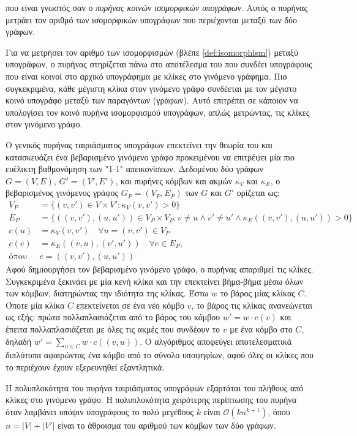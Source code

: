 που είναι γνωστός σαν ο \textit{πυρήνας κοινών ισομορφικών υπογράφων}.
Αυτός ο πυρήνας μετράει τον αριθμό των ισομορφικών υπογράφων που περιέχονται μεταξύ των δύο γράφων.\par
Για να μετρήσει τον αριθμό των ισομορφισμών (βλέπε \ref{def:isomorphism}) μεταξύ υπογράφων, ο πυρήνας στηρίζεται πάνω στο αποτέλεσμα του  \cite{levi1973note} που συνδέει υπογράφους που είναι κοινοί στο αρχικό υπογράφημα με κλίκες στο γινόμενο γράφημα.
Πιο συγκεκριμένα, κάθε μέγιστη κλίκα στον γινόμενο γράφο συνδέεται με τον μέγιστο κοινό υπογράφο μεταξύ των παραγόντων (γράφων).
Αυτό επιτρέπει σε κάποιον να υπολογίσει τον κοινό πυρήνα ισομορφισμού υπογράφων, απλώς μετρώντας, τις κλίκες στον γινόμενο γράφο.\par
Ο γενικός πυρήνας ταιριάσματος υπογράφων επεκτείνει την θεωρία του  και κατασκευάζει ένα βεβαρισμένο γινόμενο γράφο προκειμένου να επιτρέψει μία πιο ευέλικτη βαθμονόμηση των "1-1" απεικονίσεων.
Δεδομένου δύο γράφων $G=(V,E)$, $G'=(V',E')$, και πυρήνες κόμβων και ακμών $\kappa_V$ και $\kappa_E$, ο βεβαρισμένος γινόμενος γράφος $G_P=(V_P, E_P)$ των $G$ και $G'$ ορίζεται ως:
\begin{equation}
    \begin{split}
        V_P &= \{ (v,v') \in V \times V' : \kappa_V(v,v') > 0 \} \\
        E_P &= \{ ((v,v'),(u,u')) \in V_P \times V_P : v \neq u \wedge v' \neq u' \wedge \kappa_E((v,v'),(u,u')) > 0 \} \\
        c(u) &= \kappa_V(v,v') \quad \forall u=(v,v') \in V_P \\
        c(e) &= \kappa_E((v,u),(v',u')) \quad \forall e \in E_P, \\
        \text{όπου } &e=((v,v'),(u,u')) 
    \end{split}
\end{equation}
Αφού δημιουργήσει τον βεβαρισμένο γινόμενο γράφο, ο πυρήνας απαριθμεί τις κλίκες.
Συγκεκριμένα ξεκινάει με μία κενή κλίκα και την επεκτείνει βήμα-βήμα μέσω όλων των κόμβων, διατηρώντας την ιδιότητα της κλίκας. 
Έστω $w$ το βάρος μίας κλίκας $C$.
Όποτε μία κλίκα $C$ επεκτείνεται σε ένα νέο κόμβο $v$, το βάρος τις κλίκας ανανεώνεται ως εξής: πρώτα πολλαπλασιάζεται από το βάρος του κόμβου $w' = w \cdot c(v)$ και έπειτα πολλαπλασιάζεται με όλες τις ακμές που συνδέουν το $v$ με ένα κόμβο στο $C$, δηλαδή $w' = \sum_{u \in C} w \cdot c((v,u))$.
Ο αλγόριθμος αποφεύγει αποτελεσματικά διπλότυπα αφαιρώντας ένα κόμβο από το σύνολο υποψηφίων, αφού όλες οι κλίκες που το περιέχουν έχουν εξερευνηθεί εξαντλητικά.\par
Η πολυπλοκότητα του πυρήνα ταιριάσματος υπογράφων εξαρτάται του πλήθους από κλίκες στο γινόμενο γράφο.
Η πολυπλοκότητα χειρότερης περίπτωσης του πυρήνα όταν λαμβάνει υπόψιν υπογράφους το πολύ μεγέθους $k$ είναι $\mathcal{O}(kn^{k+1})$, όπου $n=|V|+|V'|$ είναι το άθροισμα του αριθμού των κόμβων των δύο γράφων.

